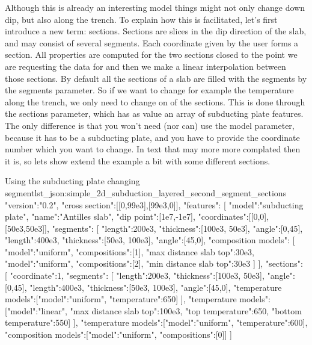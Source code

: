 \documentclass{book}
\begin{document}
Although this is already an interesting model things might not only change down dip, but also along the trench. To explain how this is facilitated, let's first introduce a new term: sections. Sections are slices in the dip direction of the slab, and may consist of several segments. Each coordinate given by the user forms a section. All properties are computed for the two sections closed to the point we are requesting the data for and then we make a linear interpolation between those sections. By default all the sections of a slab are filled with the segments by the segments parameter. So if we want to change for example the temperature along the trench, we only need to change on of the sections. This is done through the sections parameter, which has as value an array of subducting plate features. The only difference is that you won't need (nor can) use the model parameter, because it has to be a subducting plate, and you have to provide the coordinate number which you want to change. In text that may more more complated then it is, so lets show extend the example a bit with some different sections.

\begin{javascriptcode}{Using the subducting plate changing segment}{lst_json:simple_2d_subduction_layered_second_segment_sections}
{
  "version":"0.2",
  "cross section":[[0,99e3],[99e3,0]],
  "features":
  [
     {
       "model":"subducting plate", "name":"Antilles slab", "dip point":[1e7,-1e7],
       "coordinates":[[0,0],[50e3,50e3]],
       "segments":
       [
         {"length":200e3, "thickness":[100e3, 50e3], "angle":[0,45]},
         {
           "length":400e3, "thickness":[50e3, 100e3], "angle":[45,0],
           "composition models":
           [
             {"model":"uniform", "compositions":[1], "max distance slab top":30e3},
             {"model":"uniform", "compositions":[2], "min distance slab top":30e3}
           ]
         }
       ],
       "sections":
       [
         {
           "coordinate":1,
           "segments":
            [
              {"length":200e3, "thickness":[100e3, 50e3], "angle":[0,45]},
              {"length":400e3, "thickness":[50e3, 100e3], "angle":[45,0], 
                "temperature models":[{"model":"uniform", "temperature":650}]}
            ],
            "temperature models":[{"model":"linear", "max distance slab top":100e3, 
                                     "top temperature":650, "bottom temperature":550}]
         }
       ],
       "temperature models":[{"model":"uniform", "temperature":600}],
       "composition models":[{"model":"uniform", "compositions":[0]}]
    }
  ]
}
\end{javascriptcode}
\end{document}
